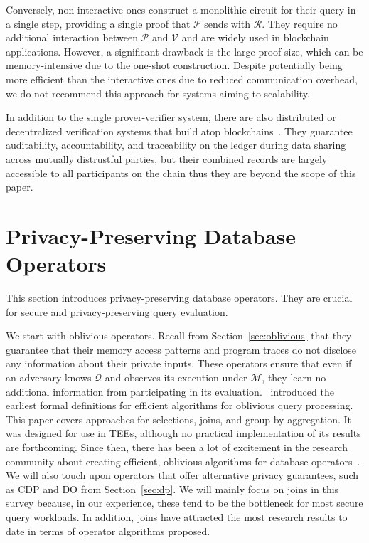 \documentclass[11pt]{article}
\newcommand{\mechanism}{$\mathcal{M}$\xspace}
\newcommand{\answer}{$\mathcal{R}$\xspace}
\newcommand{\query}{$\mathcal{Q}$\xspace}
\newcommand{\prover}{$\mathcal{P}$\xspace}
\newcommand{\verifier}{$\mathcal{V}$\xspace}
\begin{document}
Conversely, non-interactive ones construct a monolithic circuit for their query in a single step, providing a single proof that \prover sends with \answer. They require no additional interaction between \prover and \verifier and are widely used in blockchain applications. However, a significant drawback is the large proof size, which can be memory-intensive due to the one-shot construction. Despite potentially being more efficient than the interactive ones due to reduced communication overhead, we do not recommend this approach for systems aiming to scalability.

In addition to the single prover-verifier system, there are also distributed or decentralized verification systems that build atop blockchains~\cite{el2019blockchaindb, allen2019veritas, peng2020falcondb,yueglassdb}. They guarantee auditability, accountability, and traceability on the ledger during data sharing across mutually distrustful parties, but their combined records are largely accessible to all participants on the chain thus they are beyond the scope of this paper.

\section{Privacy-Preserving Database Operators}
\label{sec:ops}

This section introduces privacy-preserving database operators.  They are crucial for secure and privacy-preserving query evaluation. 


We start with oblivious operators.  Recall from Section~\ref{sec:oblivious} that they guarantee that their memory access patterns and program traces do not disclose any information about their private inputs.   These operators ensure that even if an adversary knows \query and observes its execution under \mechanism, they learn no additional information from participating in its evaluation.~\cite{arasu2014oblivious} introduced the earliest formal definitions for efficient algorithms for oblivious query processing.  This paper covers approaches for selections, joins, and group-by aggregation.  It was designed for use in TEEs, although no practical implementation of its results are forthcoming.  Since then, there has been a lot of excitement in the research community about creating efficient, oblivious algorithms for database operators~\cite{ant2024scql, bater2017smcql, krastnikov13efficient, zheng2017opaque}.  We will also touch upon operators that offer alternative privacy guarantees, such as CDP and DO from Section~\ref{sec:dp}.  We will mainly focus on joins in this survey because, in our experience, these tend to be the bottleneck for most secure query workloads.  In addition, joins have attracted the most research results to date in terms of operator algorithms proposed.
\end{document}
